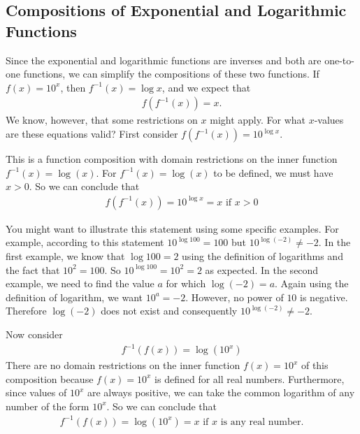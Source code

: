 \documentclass[10pt,]{book}
\theoremstyle{plain}
\theoremstyle{definition}
\theoremstyle{definition}
\theoremstyle{definition}
\numberwithin{equation}{section}
\newcommand{\gt}{>}
\begin{document}
\subsection[{Compositions of Exponential and Logarithmic Functions}]{Compositions of Exponential and Logarithmic Functions}\label{subsection-3}
\hypertarget{p-331}{}%
Since the exponential and logarithmic functions are inverses and both are one-to-one functions, we can simplify the compositions of these two functions.  If \(f(x) = 10^x\), then \(f^{-1} (x) = \log x \), and we expect that%
\begin{gather*}
f \left( f^{-1} (x) \right) = x.
\end{gather*}
We know, however, that some restrictions on \(x\) might apply.  For what \(x\)-values are these equations valid?  First consider \(f \left( f^{-1} (x) \right) = 10^{\log x}\).%
\par
\hypertarget{p-332}{}%
This is a function composition with domain restrictions on the inner function \(f^{-1} (x) = \log \left( x \right)\). For \(f^{-1} (x) = \log \left( x \right)\) to be defined, we must have \(x \gt 0\). So we can conclude that%
\begin{gather*}
f \left( f^{-1} (x) \right) = 10^{\log x} = x \text{ if } x \gt 0
\end{gather*}
%
\par
\hypertarget{p-333}{}%
You might want to illustrate this statement using some specific examples. For example, according to this statement \(10^{\log 100} = 100\) but \(10^{\log(-2)} \neq -2\). In the first example, we know that \(\log 100 = 2\) using the definition of logarithms and the fact that \(10^2 = 100\). So \(10^{\log 100} = 10^2 = 2\) as expected. In the second example, we need to find the value \(a\) for which \(\log \left( -2 \right) = a\). Again using the definition of logarithm, we want \(10^a = -2\). However, no power of \(10\) is negative. Therefore \(\log \left( -2 \right)\) does not exist and consequently \(10^{\log (-2) } \neq -2\).%
\par
\hypertarget{p-334}{}%
Now consider%
\begin{gather*}
f^{-1} \left( f (x) \right) = \log \left( 10^x \right)
\end{gather*}
There are no domain restrictions on the inner function \(f(x) = 10^x \) of this composition because \(f(x) = 10^x\) is defined for all real numbers. Furthermore, since values of \(10^x\) are always positive, we can take the common logarithm of any number of the form \(10^x\). So we can conclude that%
\begin{gather*}
f^{-1} \left( f (x) \right) = \log \left( 10^x \right) = x \text{ if } x \text{ is any real number.}
\end{gather*}
\end{document}
